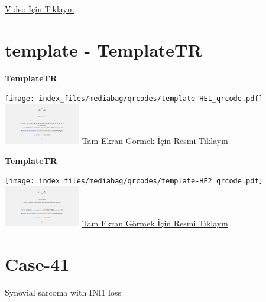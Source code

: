 \documentclass[
  letterpaper,
  DIV=11,
  numbers=noendperiod]{scrreprt}
\begin{document}
\href{https://www.youtube.com/watch?v=In97sPfT9w4}{Video İçin Tıklayın}

\hypertarget{sec-template}{%
\section{template - TemplateTR}\label{sec-template}}

\textbf{TemplateTR}

\texttt{[image: index\_files/mediabag/qrcodes/template-HE1\_qrcode.pdf]}
\href{https://images.patolojiatlasi.com/template/HE1.html}{\includegraphics[width=0.25\textwidth,height=\textheight]{./screenshots/thumbnail_template-HE1.png}}
\href{https://images.patolojiatlasi.com/template/HE1.html}{Tam Ekran
Görmek İçin Resmi Tıklayın}

\textbf{TemplateTR}

\texttt{[image: index\_files/mediabag/qrcodes/template-HE2\_qrcode.pdf]}
\href{https://images.patolojiatlasi.com/template/HE2.html}{\includegraphics[width=0.25\textwidth,height=\textheight]{./screenshots/thumbnail_template-HE2.png}}
\href{https://images.patolojiatlasi.com/template/HE2.html}{Tam Ekran
Görmek İçin Resmi Tıklayın}

\hypertarget{sec-hacettepe-com-case-41}{%
\section{Case-41}\label{sec-hacettepe-com-case-41}}

\begin{tcolorbox}[enhanced jigsaw, breakable, opacitybacktitle=0.6, arc=.35mm, colbacktitle=quarto-callout-tip-color!10!white, colback=white, toptitle=1mm, left=2mm, opacityback=0, colframe=quarto-callout-tip-color-frame, titlerule=0mm, rightrule=.15mm, bottomrule=.15mm, toprule=.15mm, bottomtitle=1mm, title=\textcolor{quarto-callout-tip-color}{\faLightbulb}\hspace{0.5em}{Tanı}, coltitle=black, leftrule=.75mm]

Synovial sarcoma with INI1 loss

\end{tcolorbox}
\end{document}
